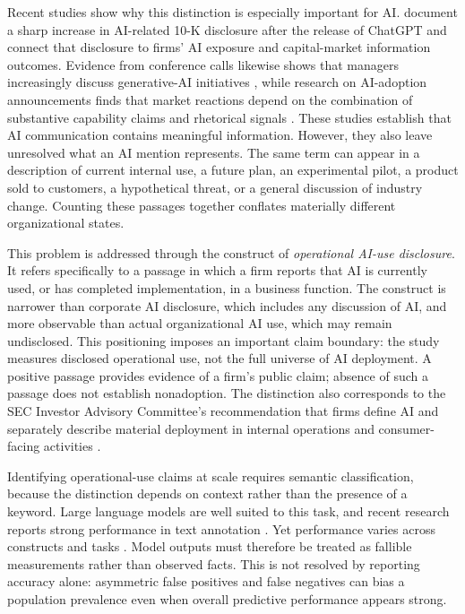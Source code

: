 \documentclass[12pt]{article}
\begin{document}
Recent studies show why this distinction is especially important for AI.
\citet{anantharaman2026disclosure} document a sharp increase in AI-related
10-K disclosure after the release of ChatGPT and connect that disclosure to
firms' AI exposure and capital-market information outcomes. Evidence from
conference calls likewise shows that managers increasingly discuss
generative-AI initiatives \citep{jia2026genai}, while research on
AI-adoption announcements finds that market reactions depend on the
combination of substantive capability claims and rhetorical signals
\citep{nishant2024signals}. These studies establish that AI communication
contains meaningful information. However, they also leave unresolved what an
AI mention represents. The same term can appear in a description of current
internal use, a future plan, an experimental pilot, a product sold to
customers, a hypothetical threat, or a general discussion of industry change.
Counting these passages together conflates materially different organizational
states.

This problem is addressed through the construct of \emph{operational AI-use
disclosure}. It refers specifically to a passage in which a firm reports that
AI is currently used, or has completed implementation, in a business function.
The construct is narrower than corporate AI disclosure, which includes any
discussion of AI, and more observable than actual organizational AI use, which
may remain undisclosed. This positioning imposes an important claim boundary:
the study measures disclosed operational use, not the full universe of AI
deployment. A positive passage provides evidence of a firm's public claim;
absence of such a passage does not establish nonadoption. The distinction also
corresponds to the SEC Investor Advisory Committee's recommendation that firms
define AI and separately describe material deployment in internal operations
and consumer-facing activities \citep{sec2025recommendation}.

Identifying operational-use claims at scale requires semantic classification,
because the distinction depends on context rather than the presence of a
keyword. Large language models are well suited to this task, and recent
research reports strong performance in text annotation
\citep{gilardi2023annotation,mellon2024open}. Yet performance varies across
constructs and tasks \citep{ziems2024css}. Model outputs must therefore be
treated as fallible measurements rather than observed facts. This is not
resolved by reporting accuracy alone: asymmetric false positives and false
negatives can bias a population prevalence even when overall predictive
performance appears strong.
\end{document}
